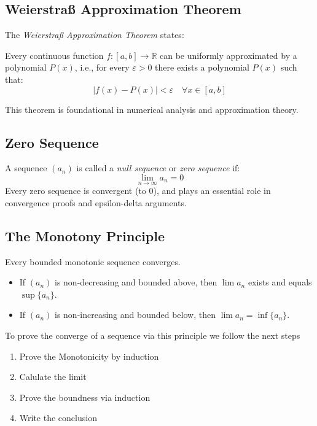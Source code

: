 \subsection{Weierstraß Approximation Theorem}

The \emph{Weierstraß Approximation Theorem} states:

Every continuous function \(f: [a, b] \rightarrow \mathbb{R}\) can be uniformly approximated by a polynomial \(P(x)\), i.e., for every \(\varepsilon > 0\) there exists a polynomial \(P(x)\) such that:
\[
|f(x) - P(x)| < \varepsilon \quad \forall x \in [a, b]
\]

This theorem is foundational in numerical analysis and approximation theory.

\subsection{Zero Sequence}

A sequence \((a_n)\) is called a \emph{null sequence} or \emph{zero sequence} if:
\[
\lim_{n \to \infty} a_n = 0
\]
Every zero sequence is convergent (to 0), and plays an essential role in convergence proofs and epsilon-delta arguments.

\subsection{The Monotony Principle}

Every bounded monotonic sequence converges.

\begin{itemize}[label=\(-\)]
\item If \((a_n)\) is non-decreasing and bounded above, then \(\lim a_n\) exists and equals \(\sup \{a_n\}\).
\item If \((a_n)\) is non-increasing and bounded below, then \(\lim a_n = \inf \{a_n\}\).
\end{itemize}

To prove the converge of a sequence via this principle we follow the next steps

\begin{enumerate}
    \item Prove the Monotonicity by induction
    \item Calulate the limit
    \item Prove the boundness via induction
    \item Write the conclusion
\end{enumerate}


